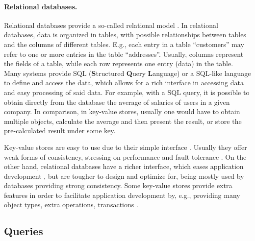 \paragraph{Relational databases.}
Relational databases provide a so-called relational model \cite{spanner, eiger, noria}. %
In relational databases, data is organized in tables, with possible relationships between tables and the columns of different tables.
E.g., each entry in a table ``customers'' may refer to one or more entries in the table ``addresses''.
Usually, columns represent the fields of a table, while each row represents one entry (data) in the table.
Many systems provide SQL (\textbf{S}tructured \textbf{Q}uery \textbf{L}anguage) or a SQL-like language \cite{sequel, spanner, noria, mongoVScassandra} to define and access the data, which allows for a rich interface in accessing data and easy processing of said data.
For example, with a SQL query, it is possible to obtain directly from the database the average of salaries of users in a given company.
In comparison, in key-value stores, usually one would have to obtain multiple objects, calculate the average and then present the result, or store the pre-calculated result under some key.

Key-value stores are easy to use due to their simple interface \cite{dynamo}. 
Usually they offer weak forms of consistency, stressing on performance and fault tolerance \cite{dynamo, cops, cure}.
On the other hand, relational databases have a richer interface, which eases application development \cite{spanner, noria, eiger}, but are tougher to design and optimize for, being mostly used by databases providing strong consistency.
Some key-value stores provide extra features in order to facilitate application development by, e.g., providing many object types, extra operations, transactions \cite{cure, walter}.

\subsection{Queries}
\label{subsec:queries}


